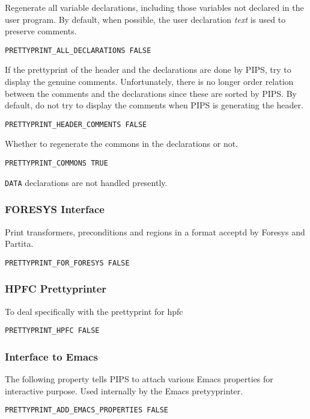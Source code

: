 Regenerate all variable declarations, including those variables not
declared in the user program. By default, when possible, the user
declaration {\em text} is used to preserve comments.

\begin{verbatim}
PRETTYPRINT_ALL_DECLARATIONS FALSE
\end{verbatim}

If the prettyprint of the header and the declarations are done by
PIPS, try to display the genuine comments. Unfortunately, there is no
longer order relation between the comments and the declarations since
these are sorted by PIPS. By default, do not try to display the
comments when PIPS is generating the header.
\begin{verbatim}
PRETTYPRINT_HEADER_COMMENTS FALSE
\end{verbatim}

Whether to regenerate the commons in the declarations or not.

\begin{verbatim}
PRETTYPRINT_COMMONS TRUE
\end{verbatim}

\verb/DATA/ declarations are not handled presently.

\subsubsection{FORESYS Interface}

Print transformers, preconditions and regions in a format acceptd by
Foresys and Partita.

\begin{verbatim}
PRETTYPRINT_FOR_FORESYS FALSE
\end{verbatim}

\subsubsection{HPFC Prettyprinter}

To deal specifically with the prettyprint for hpfc

\begin{verbatim}
PRETTYPRINT_HPFC FALSE
\end{verbatim}


\subsubsection{Interface to Emacs}

The following property tells PIPS to attach various Emacs properties
for interactive purpose. Used internally by the Emacs pretyyprinter.
\begin{verbatim}
PRETTYPRINT_ADD_EMACS_PROPERTIES FALSE
\end{verbatim}


